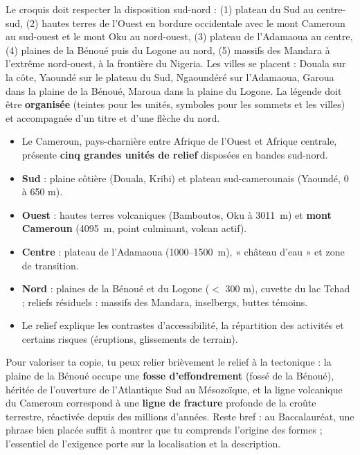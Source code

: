 \documentclass[11pt]{article}
\newcommand{\cle}[1]{{\popxbold\color{popdark}#1}}
\begin{document}
\begin{corrige}
Le croquis doit respecter la disposition sud-nord : (1) plateau du Sud au centre-sud, (2) hautes terres de l'Ouest en bordure occidentale avec le mont Cameroun au sud-ouest et le mont Oku au nord-ouest, (3) plateau de l'Adamaoua au centre, (4) plaines de la Bénoué puis du Logone au nord, (5) massifs des Mandara à l'extrême nord-ouest, à la frontière du Nigeria. Les villes se placent : Douala sur la côte, Yaoundé sur le plateau du Sud, Ngaoundéré sur l'Adamaoua, Garoua dans la plaine de la Bénoué, Maroua dans la plaine du Logone. La légende doit être \textbf{organisée} (teintes pour les unités, symboles pour les sommets et les villes) et accompagnée d'un titre et d'une flèche du nord.
\end{corrige}

\begin{aretenir}
\begin{itemize}
\item Le Cameroun, pays-charnière entre Afrique de l'Ouest et Afrique centrale, présente \textbf{cinq grandes unités de relief} disposées en bandes sud-nord.
\item \textbf{Sud} : plaine côtière (Douala, Kribi) et plateau sud-camerounais (Yaoundé, 0 à 650 m).
\item \textbf{Ouest} : hautes terres volcaniques (Bamboutos, Oku à \SI{3011}{m}) et \textbf{mont Cameroun} (\SI{4095}{m}, point culminant, volcan actif).
\item \textbf{Centre} : plateau de l'Adamaoua (\num{1000}--\SI{1500}{m}), « château d'eau » et zone de transition.
\item \textbf{Nord} : plaines de la Bénoué et du Logone ($<$ 300 m), cuvette du lac Tchad ; reliefs résiduels : massifs des Mandara, inselbergs, buttes témoins.
\item Le relief explique les contrastes d'accessibilité, la répartition des activités et certains risques (éruptions, glissements de terrain).
\end{itemize}
\end{aretenir}

\begin{savaistu}
Pour valoriser ta copie, tu peux relier brièvement le relief à la \cle{tectonique} : la plaine de la Bénoué occupe une \textbf{fosse d'effondrement} (fossé de la Bénoué), héritée de l'ouverture de l'Atlantique Sud au Mésozoïque, et la ligne volcanique du Cameroun correspond à une \textbf{ligne de fracture} profonde de la croûte terrestre, réactivée depuis des millions d'années. Reste bref : au Baccalauréat, une phrase bien placée suffit à montrer que tu comprends l'origine des formes ; l'essentiel de l'exigence porte sur la localisation et la description.
\end{savaistu}
\end{document}
